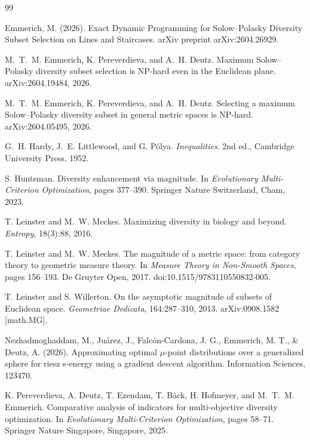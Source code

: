\documentclass[12pt,a4paper]{article}
\begin{document}
\begin{thebibliography}{99}

Emmerich, M. (2026).
\newblock  Exact Dynamic Programming for Solow--Polasky Diversity Subset Selection on Lines and Staircases. arXiv preprint arXiv:2604.26929.

M.~T.~M. Emmerich, K. Pereverdieva, and A.~H. Deutz.
\newblock Maximum Solow--Polasky diversity subset selection is NP-hard even in the Euclidean plane.
\newblock arXiv:2604.19484, 2026.

M.~T.~M. Emmerich, K. Pereverdieva, and A.~H. Deutz.
\newblock Selecting a maximum Solow--Polasky diversity subset in general metric spaces is NP-hard.
\newblock arXiv:2604.05495, 2026.


G.~H. Hardy, J.~E. Littlewood, and G. P\'olya.
\newblock \emph{Inequalities}.
\newblock 2nd ed., Cambridge University Press, 1952.

S. Huntsman.
\newblock Diversity enhancement via magnitude.
\newblock In \emph{Evolutionary Multi-Criterion Optimization}, pages 377--390.
\newblock Springer Nature Switzerland, Cham, 2023.

T. Leinster and M.~W. Meckes.
\newblock Maximizing diversity in biology and beyond.
\newblock \emph{Entropy}, 18(3):88, 2016.

T. Leinster and M.~W. Meckes.
\newblock The magnitude of a metric space: from category theory to geometric measure theory.
\newblock In \emph{Measure Theory in Non-Smooth Spaces}, pages 156--193.
\newblock De Gruyter Open, 2017. doi:10.1515/9783110550832-005.

T. Leinster and S. Willerton.
\newblock On the asymptotic magnitude of subsets of Euclidean space.
\newblock \emph{Geometriae Dedicata}, 164:287--310, 2013.
\newblock arXiv:0908.1582 [math.MG].

 Nezhadmoghaddam, M., Juárez, J., Falcón-Cardona, J. G., Emmerich, M. T., \& Deutz, A. (2026). Approximating optimal $\mu$-point distributions over a generalized sphere for riesz s-energy using a gradient descent algorithm. Information Sciences, 123470.

K. Pereverdieva, A. Deutz, T. Ezendam, T. B{\"a}ck, H. Hofmeyer, and M.~T.~M. Emmerich.
\newblock Comparative analysis of indicators for multi-objective diversity optimization.
\newblock In \emph{Evolutionary Multi-Criterion Optimization}, pages 58--71.
\newblock Springer Nature Singapore, Singapore, 2025.


\end{thebibliography}
\end{document}

